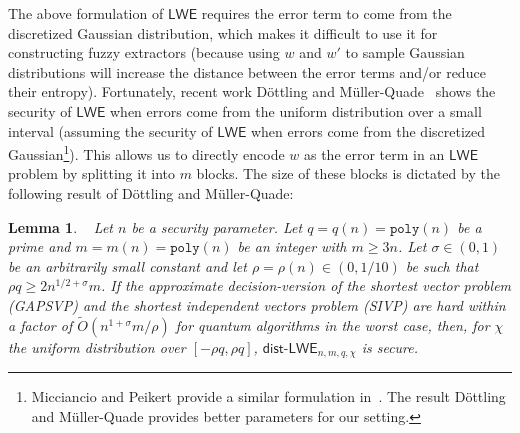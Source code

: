 \documentclass[11pt]{article}
\newcommand{\class}[1]{{\ensuremath{\mathsf{#1}}}}
\newcommand{\rep}{\ensuremath{\class{Rep}}\xspace}
\newcommand{\vect}[1]{\ensuremath{\textbf{#1}}}
\newcommand{\poly}{\ensuremath{\mathtt{poly}}\xspace}
\newcommand{\LWE}{\class{LWE}}
\newcommand{\distLWE}{\ensuremath{\class{dist\mbox{-}LWE}}}
\newtheorem{lemma}[theorem]{Lemma}
\newcommand{\vA}{\vect{A}}
\begin{document}
The above formulation of $\LWE$ requires the error term to come from the discretized Gaussian distribution, which makes it difficult to use it for constructing fuzzy extractors (because using $w$ and $w'$ to sample Gaussian distributions will increase the distance between the error terms and/or reduce their entropy).
Fortunately, recent work D\"{o}ttling and M\"{u}ller-Quade~\cite{dottling2012} shows the security of $\LWE$ when errors come from the uniform distribution over a small interval (assuming the security of $\LWE$ when errors come from the discretized Gaussian\footnote{Micciancio and Peikert provide a similar formulation in~\cite{micciancio2013hardness}.  The result D\"{o}ttling and M\"{u}ller-Quade provides better parameters for our setting.}).  This allows us to directly encode $w$ as the error term in an $\LWE$ problem by splitting it  into $m$ blocks.  The size of these blocks is dictated by the following result of D\"{o}ttling and M\"{u}ller-Quade:

\begin{lemma}~
\label{lem:uniform LWE decision}
Let $n$ be a security parameter.  Let $q = q(n) = \poly(n)$ be a prime and $m = m(n) = \poly(n)$ be an integer with $m\ge 3n$. Let $\sigma \in (0, 1)$ be an arbitrarily small  constant and let $\rho=\rho(n)\in (0,1/10)$ be such that $\rho q \geq 2n^{1/2+\sigma}m$. If the approximate decision-version of the shortest vector problem (GAPSVP) and the shortest independent vectors problem (SIVP) are hard within a factor of $\tilde{O}(n^{1+\sigma}m/\rho)$ for quantum algorithms in the worst case, then, for $\chi$ the uniform distribution over $[-\rho q, \rho q]$,  $\distLWE_{n, m, q, \chi}$ is secure.
\end{lemma}
\end{document}
